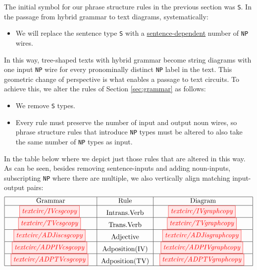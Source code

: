 The initial symbol for our phrase structure rules in the previous section was \texttt{S}.  In the passage from hybrid grammar to text diagrams, systematically: 
\begin{itemize}
\item We will replace the sentence type \texttt{S} with a \underline{sentence-dependent} number of \texttt{NP} wires. 
\end{itemize}
In this way, tree-shaped texts with hybrid grammar become string diagrams with one input \texttt{NP} wire for every pronominally distinct \texttt{NP} label in the text. This geometric change of perspective is what enables a passage to text circuits. To achieve this, we alter the rules of Section \ref{sec:grammar} as follows:
\begin{itemize}
    \item We remove \texttt{S} types.
    \item Every rule must preserve the number of input and output noun wires, so phrase structure rules that introduce \texttt{NP} types must be altered to also take the same number of \texttt{NP} types as input.
\end{itemize}
In the table below where we depict just those rules that are altered in this way. As can be seen, besides removing sentence-inputs and adding  noun-inputs, subscripting \texttt{NP} where there are multiple, we also vertically align matching input-output pairs:
\[
\begin{tabular}{|c|c|c|}
\hline
\text{Grammar} & \text{Rule} & \text{Diagram}  \\ \hline
\tikzfig{textcirc/IVcsgcopy} & \text{Intrans.Verb} & \tikzfig{textcirc/IVgraphcopy} \\ \hline
\tikzfig{textcirc/TVcsgcopy} & \text{Trans.Verb} & \tikzfig{textcirc/TVgraphcopy} \\ \hline
\tikzfig{textcirc/ADJiscsgcopy} & \text{Adjective} & \tikzfig{textcirc/ADJisgraphcopy} \\ \hline
\tikzfig{textcirc/ADPIVcsgcopy} & \text{Adposition(IV)} & \tikzfig{textcirc/ADPIVgraphcopy} \\ \hline
\tikzfig{textcirc/ADPTVcsgcopy} & \text{Adposition(TV)} & \tikzfig{textcirc/ADPTVgraphcopy} \\ \hline
\end{tabular}
\]
